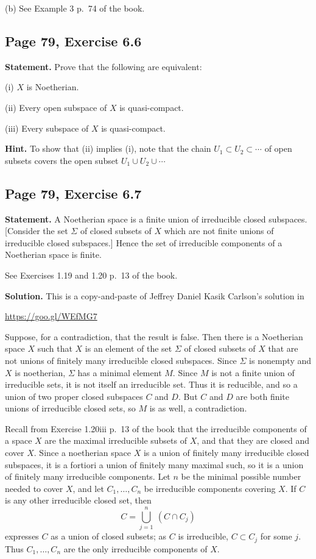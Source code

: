 \documentclass[parskip=half,fontsize=12pt]{scrartcl}%
\begin{document}
(b) See Example 3 p.~74 of the book.

\subsection{Page 79, Exercise 6.6}%

\textbf{Statement.} Prove that the following are equivalent: 

(i) $X$ is Noetherian.

(ii) Every open subspace of $X$ is quasi-compact. 

(iii) Every subspace of $X$ is quasi-compact.


\textbf{Hint.} To show that (ii) implies (i), note that the chain $U_1\subset U_2\subset\cdots$ of open subsets covers the open subset $U_1\cup U_2\cup\cdots$

\subsection{Page 79, Exercise 6.7}%

\textbf{Statement.} A Noetherian space is a finite union of irreducible closed subspaces. [Consider the set $\Sigma$ of closed subsets of $X$ which are not finite unions of irreducible closed subspaces.] Hence the set of irreducible components of a Noetherian space is finite.

See Exercises 1.19 and 1.20 p.~13 of the book. 

\textbf{Solution.} This is a copy-and-paste of Jeffrey Daniel Kasik Carlson's solution in\medskip 

\centerline{\href{https://goo.gl/WEfMG7}{https://goo.gl/WEfMG7}}

Suppose, for a contradiction, that the result is false. Then there is a Noetherian space $X$ such that $X$ is an element of the set $\Sigma$ of closed subsets of $X$ that are not unions of finitely many irreducible closed subspaces. Since $\Sigma$ is nonempty and $X$ is noetherian, $\Sigma$ has a minimal element $M$. Since $M$ is not a finite union of irreducible sets, it is not itself an irreducible set. Thus it is reducible, and so a union of two proper closed subspaces $C$ and $D$. But $C$ and $D$ are both finite unions of irreducible closed sets, so $M$ is as well, a contradiction.

Recall from Exercise 1.20iii p.~13 of the book that the irreducible components of a space $X$ are the maximal irreducible subsets of $X$, and that they are closed and cover $X$. Since a noetherian space $X$ is a union of finitely many irreducible closed subspaces, it is a fortiori a union of finitely many maximal such, so it is a union of finitely many irreducible components. Let $n$ be the minimal possible number needed to cover $X$, and let $C_1,\ldots,C_n$ be irreducible components covering $X$. If $C$ is any other irreducible closed set, then 
$$
C=\bigcup_{j=1}^n\ (C\cap C_j)
$$ 
expresses $C$ as a union of closed subsets; as $C$ is irreducible, $C\subset C_j$ for some $j$. Thus $C_1,\ldots,C_n$ are the only irreducible components of $X$. 
\end{document}
